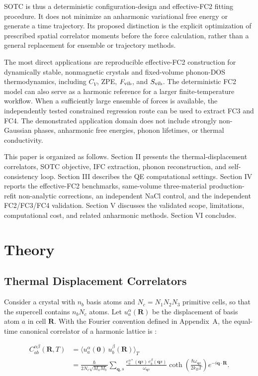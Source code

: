 \documentclass[aps,prb,reprint,amsmath,amssymb,floatfix]{revtex4-2}
\begin{document}
SOTC is thus a deterministic configuration-design and effective-FC2 fitting
procedure. It does not minimize an anharmonic variational free energy or
generate a time trajectory. Its proposed distinction is the explicit
optimization of prescribed spatial correlator moments before the force
calculation, rather than a general replacement for ensemble or trajectory
methods.

The most direct applications are reproducible effective-FC2 construction for
dynamically stable, nonmagnetic crystals and fixed-volume phonon-DOS
thermodynamics, including \(C_V\), ZPE, \(F_{\rm vib}\), and
\(S_{\rm vib}\). The deterministic FC2 model can also serve as a harmonic
reference for a larger finite-temperature workflow. When a sufficiently large
ensemble of forces is available, the independently tested constrained
regression route can be used to extract FC3 and FC4. The demonstrated application domain does not
include strongly non-Gaussian phases, anharmonic free energies, phonon
lifetimes, or thermal conductivity.

This paper is organized as follows. Section II presents the thermal-displacement
correlators, SOTC objective, IFC extraction, phonon reconstruction, and
self-consistency loop. Section III describes the QE computational settings.
Section IV reports the effective-FC2 benchmarks, same-volume three-material
production-refit non-analytic corrections, an independent NaCl control,
and the independent FC2/FC3/FC4 validation. Section V discusses the validated
scope, limitations, computational cost, and related anharmonic methods.
Section VI concludes.

\section{Theory}\label{theory}

\subsection{Thermal Displacement
Correlators}\label{thermal-displacement-correlators}

Consider a crystal with \(n_b\) basis atoms and \(N_c=N_1N_2N_3\)
primitive cells, so that the supercell contains \(n_bN_c\) atoms. Let
\(u_a^\alpha(\mathbf R)\) be the displacement of basis atom \(a\) in cell
\(\mathbf R\). With the Fourier convention defined in Appendix~A, the
equal-time canonical correlator of a harmonic lattice is \cite{ref13}:

{\scriptsize
\begin{align}
C_{ab}^{\alpha\beta}(\mathbf{R},T)
  &= \langle u_a^\alpha(\mathbf{0})\, u_b^\beta(\mathbf{R})\rangle_T \nonumber \\
  &= \frac{\hbar}{2N_c\sqrt{M_a M_b}} \sum_{\mathbf{q},s}
     \frac{e_a^{\alpha*}(\mathbf{q}s)\,e_b^{\beta}(\mathbf{q}s)}{\omega_{\mathbf{q}s}}
     \coth\!\left(\frac{\hbar\omega_{\mathbf{q}s}}{2k_BT}\right)
     e^{-i\mathbf{q}\cdot\mathbf{R}} .
\end{align}
}
\end{document}
